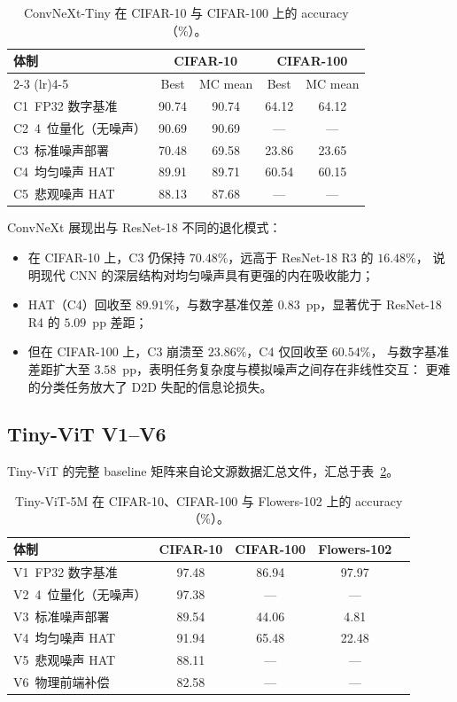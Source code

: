\begin{table}[htbp]
\centering
\caption{ConvNeXt-Tiny 在 CIFAR-10 与 CIFAR-100 上的 accuracy（\%）。}
\label{tab:convnext-results}
\begin{tabular}{@{}lcccc@{}}
\toprule
\textbf{体制} & \multicolumn{2}{c}{\textbf{CIFAR-10}} & \multicolumn{2}{c}{\textbf{CIFAR-100}} \\
\cmidrule(lr){2-3} \cmidrule(lr){4-5}
& Best & MC mean & Best & MC mean \\
\midrule
C1~FP32 数字基准 & 90.74 & 90.74 & 64.12 & 64.12 \\
C2~4~位量化（无噪声） & 90.69 & 90.69 & --- & --- \\
C3~标准噪声部署 & 70.48 & 69.58 & 23.86 & 23.65 \\
C4~均匀噪声 HAT & 89.91 & 89.71 & 60.54 & 60.15 \\
C5~悲观噪声 HAT & 88.13 & 87.68 & --- & --- \\
\bottomrule
\end{tabular}
\end{table}

ConvNeXt 展现出与 ResNet-18 不同的退化模式：
\begin{itemize}
    \item 在 CIFAR-10 上，C3 仍保持 $70.48\%$，远高于 ResNet-18 R3 的 $16.48\%$，
    说明现代 CNN 的深层结构对均匀噪声具有更强的内在吸收能力；
    \item HAT（C4）回收至 $89.91\%$，与数字基准仅差 $0.83$~pp，显著优于 ResNet-18 R4 的 $5.09$~pp 差距；
    \item 但在 CIFAR-100 上，C3 崩溃至 $23.86\%$，C4 仅回收至 $60.54\%$，
    与数字基准差距扩大至 $3.58$~pp，表明任务复杂度与模拟噪声之间存在非线性交互：
    更难的分类任务放大了 D2D 失配的信息论损失。
\end{itemize}

\subsection{Tiny-ViT V1--V6}

Tiny-ViT 的完整 baseline 矩阵来自论文源数据汇总文件，汇总于表~\ref{tab:tinyvit-results}。

\begin{table}[htbp]
\centering
\caption{Tiny-ViT-5M 在 CIFAR-10、CIFAR-100 与 Flowers-102 上的 accuracy（\%）。}
\label{tab:tinyvit-results}
\begin{tabular}{@{}lcccc@{}}
\toprule
\textbf{体制} & \textbf{CIFAR-10} & \textbf{CIFAR-100} & \textbf{Flowers-102} \\
\midrule
V1~FP32 数字基准 & 97.48 & 86.94 & 97.97 \\
V2~4~位量化（无噪声） & 97.38 & --- & --- \\
V3~标准噪声部署 & 89.54 & 44.06 & 4.81 \\
V4~均匀噪声 HAT & 91.94 & 65.48 & 22.48 \\
V5~悲观噪声 HAT & 88.11 & --- & --- \\
V6~物理前端补偿 & 82.58 & --- & --- \\
\bottomrule
\end{tabular}
\end{table}

